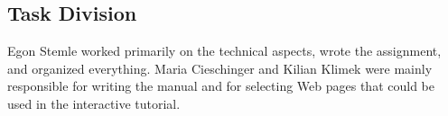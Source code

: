 \documentclass[12pt]{article}
\begin{document}
\subsection{Task Division}

Egon Stemle worked primarily on the technical aspects, wrote the assignment, and organized everything. Maria Cieschinger and Kilian Klimek were mainly responsible for writing the manual and for selecting Web pages that could be used in the interactive tutorial.

\nocite{*}

\footnotesize


\normalsize

\newpage
\pagestyle{empty}


\end{document}

